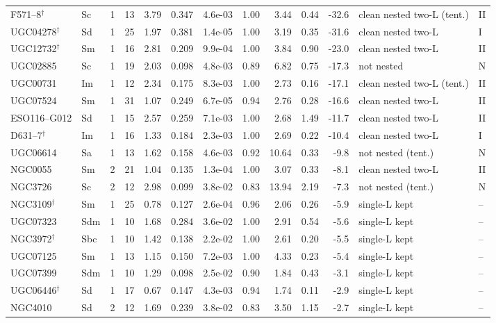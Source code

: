 \documentclass[10pt]{article}
\begin{document}
\begin{landscape}
{\begin{longtable}{lllrrrrrrrrll}
F571--8$^\dagger$ & Sc & 1 & 13 & 3.79 & 0.347 & 4.6e-03 & 1.00 & 3.44 & 0.44 & -32.6 & clean nested two-L (tent.) & II\\
UGC04278$^\dagger$ & Sd & 1 & 25 & 1.97 & 0.381 & 1.4e-05 & 1.00 & 3.19 & 0.35 & -31.6 & clean nested two-L & I\\
UGC12732$^\dagger$ & Sm & 1 & 16 & 2.81 & 0.209 & 9.9e-04 & 1.00 & 3.84 & 0.90 & -23.0 & clean nested two-L & II\\
UGC02885 & Sc & 1 & 19 & 2.03 & 0.098 & 4.8e-03 & 0.89 & 6.82 & 0.75 & -17.3 & not nested & N\\
UGC00731 & Im & 1 & 12 & 2.34 & 0.175 & 8.3e-03 & 1.00 & 2.73 & 0.16 & -17.1 & clean nested two-L (tent.) & II\\
UGC07524 & Sm & 1 & 31 & 1.07 & 0.249 & 6.7e-05 & 0.94 & 2.76 & 0.28 & -16.6 & clean nested two-L & II\\
ESO116--G012 & Sd & 1 & 15 & 2.57 & 0.259 & 7.1e-03 & 1.00 & 2.68 & 1.49 & -11.7 & clean nested two-L & II\\
D631--7$^\dagger$ & Im & 1 & 16 & 1.33 & 0.184 & 2.3e-03 & 1.00 & 2.69 & 0.22 & -10.4 & clean nested two-L & I\\
UGC06614 & Sa & 1 & 13 & 1.62 & 0.158 & 4.6e-03 & 0.92 & 10.64 & 0.33 & -9.8 & not nested (tent.) & N\\
NGC0055 & Sm & 2 & 21 & 1.04 & 0.135 & 1.3e-04 & 1.00 & 3.07 & 0.33 & -8.1 & clean nested two-L & II\\
NGC3726 & Sc & 2 & 12 & 2.98 & 0.099 & 3.8e-02 & 0.83 & 13.94 & 2.19 & -7.3 & not nested (tent.) & N\\
NGC3109$^\dagger$ & Sm & 1 & 25 & 0.78 & 0.127 & 2.6e-04 & 0.96 & 2.06 & 0.26 & -5.9 & single-L kept & --\\
UGC07323 & Sdm & 1 & 10 & 1.68 & 0.284 & 3.6e-02 & 1.00 & 2.91 & 0.54 & -5.6 & single-L kept & --\\
NGC3972$^\dagger$ & Sbc & 1 & 10 & 1.42 & 0.138 & 2.2e-02 & 1.00 & 2.61 & 0.20 & -5.5 & single-L kept & --\\
UGC07125 & Sm & 1 & 13 & 1.15 & 0.150 & 7.2e-03 & 1.00 & 4.33 & 0.23 & -5.4 & single-L kept & --\\
UGC07399 & Sdm & 1 & 10 & 1.29 & 0.098 & 2.5e-02 & 0.90 & 1.84 & 0.43 & -3.1 & single-L kept & --\\
UGC06446$^\dagger$ & Sd & 1 & 17 & 0.67 & 0.147 & 4.3e-03 & 0.94 & 1.74 & 0.11 & -2.9 & single-L kept & --\\
NGC4010 & Sd & 2 & 12 & 1.69 & 0.239 & 3.8e-02 & 0.83 & 3.50 & 1.15 & -2.7 & single-L kept & --\\

\end{longtable}}
\end{landscape}
\end{document}
